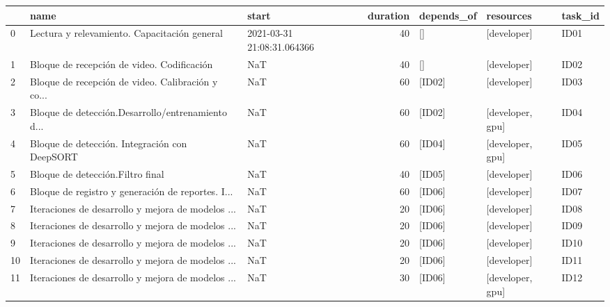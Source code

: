 \begin{tabular}{lllrlll}
\toprule
{} &                                               name &                      start &  duration &                      depends\_of &              resources & task\_id \\
\midrule
0  &       Lectura y relevamiento. Capacitación general & 2021-03-31 21:08:31.064366 &        40 &                              [] &            [developer] &    ID01 \\
1  &         Bloque de recepción de video. Codificación &                        NaT &        40 &                              [] &            [developer] &    ID02 \\
2  &  Bloque de recepción de video. Calibración y co... &                        NaT &        60 &                          [ID02] &            [developer] &    ID03 \\
3  &  Bloque de detección.Desarrollo/entrenamiento d... &                        NaT &        60 &                          [ID02] &       [developer, gpu] &    ID04 \\
4  &      Bloque de detección. Integración con DeepSORT &                        NaT &        60 &                          [ID04] &       [developer, gpu] &    ID05 \\
5  &                   Bloque de detección.Filtro final &                        NaT &        40 &                          [ID05] &            [developer] &    ID06 \\
6  &  Bloque de registro y generación de reportes. I... &                        NaT &        60 &                          [ID06] &            [developer] &    ID07 \\
7  &  Iteraciones de desarrollo y mejora de modelos ... &                        NaT &        20 &                          [ID06] &            [developer] &    ID08 \\
8  &  Iteraciones de desarrollo y mejora de modelos ... &                        NaT &        20 &                          [ID06] &            [developer] &    ID09 \\
9  &  Iteraciones de desarrollo y mejora de modelos ... &                        NaT &        20 &                          [ID06] &            [developer] &    ID10 \\
10 &  Iteraciones de desarrollo y mejora de modelos ... &                        NaT &        20 &                          [ID06] &            [developer] &    ID11 \\
11 &  Iteraciones de desarrollo y mejora de modelos ... &                        NaT &        30 &                          [ID06] &       [developer, gpu] &    ID12 \\

\end{tabular}
